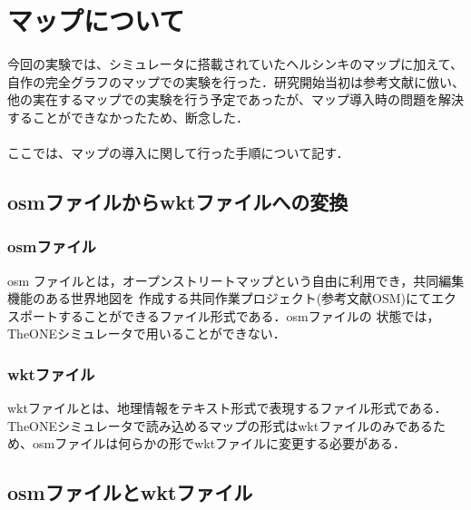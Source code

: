 \documentclass[11pt]{icsthesis}
\begin{document}
\clearpage
\fancyhead[L]{\nouppercase{\small\leftmark}}
\fancyhead[R]{\nouppercase{\small\rightmark}}
\fancyfoot[C]{--\ \thepage\ --}
\renewcommand{\headrulewidth}{0.3truemm}
\appendix
\chapter{マップについて}
今回の実験では、シミュレータに搭載されていたヘルシンキのマップに加えて、自作の完全グラフのマップでの実験を行った．研究開始当初は参考文献に倣い、他の実在するマップでの実験を行う予定であったが、マップ導入時の問題を解決することができなかったため、断念した．\\\\
ここでは、マップの導入に関して行った手順について記す．

\section{osmファイルからwktファイルへの変換}



\subsection{osmファイル}
osm ファイルとは，オープンストリートマップという自由に利用でき，共同編集機能のある世界地図を
作成する共同作業プロジェクト(参考文献OSM)にてエクスポートすることができるファイル形式である．osmファイルの
状態では，TheONEシミュレータで用いることができない．
\subsection{wktファイル}
wktファイルとは、地理情報をテキスト形式で表現するファイル形式である．TheONEシミュレータで読み込めるマップの形式はwktファイルのみであるため、osmファイルは何らかの形でwktファイルに変更する必要がある．
\section{osmファイルとwktファイル}
\end{document}
